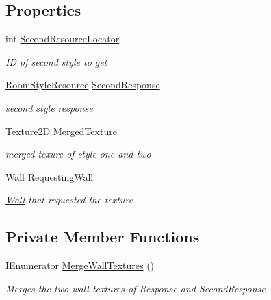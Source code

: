 \subsection*{Properties}
\begin{DoxyCompactItemize}
\item 
int \mbox{\hyperlink{class_multi_wall_texture_request_a3f9a316d5e1b6e9747d91257b03d45a0}{Second\+Resource\+Locator}}
\begin{DoxyCompactList}\small\item\em ID of second style to get \end{DoxyCompactList}\item 
\mbox{\hyperlink{class_room_style_resource}{Room\+Style\+Resource}} \mbox{\hyperlink{class_multi_wall_texture_request_a5973e2715491e6d34270f14e1c0d33e7}{Second\+Response}}
\begin{DoxyCompactList}\small\item\em second style response \end{DoxyCompactList}\item 
Texture2D \mbox{\hyperlink{class_multi_wall_texture_request_a26f962cdfff74d5594cc5216d4c0065e}{Merged\+Texture}}
\begin{DoxyCompactList}\small\item\em merged texure of style one and two \end{DoxyCompactList}\item 
\mbox{\hyperlink{class_wall}{Wall}} \mbox{\hyperlink{class_multi_wall_texture_request_a73e34826ed183281d7fd34f5d263d72c}{Requesting\+Wall}}
\begin{DoxyCompactList}\small\item\em \mbox{\hyperlink{class_wall}{Wall}} that requested the texture \end{DoxyCompactList}\end{DoxyCompactItemize}
\subsection*{Private Member Functions}
\begin{DoxyCompactItemize}
\item 
I\+Enumerator \mbox{\hyperlink{class_multi_wall_texture_request_a66ff9bddcb7230947278ff32f2957ec7}{Merge\+Wall\+Textures}} ()
\begin{DoxyCompactList}\small\item\em Merges the two wall textures of Response and Second\+Response \end{DoxyCompactList}\end{DoxyCompactItemize}


